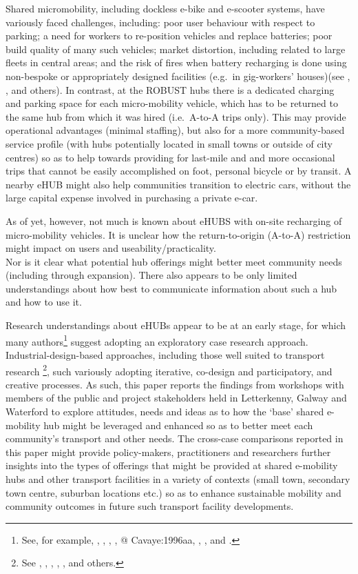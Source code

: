 \documentclass[preprint, 3p,
authoryear]{elsarticle} %
\begin{document}
Shared micromobility, including dockless e-bike and e-scooter systems,
have variously faced challenges, including: poor user behaviour with
respect to parking; a need for workers to re-position vehicles and
replace batteries; poor build quality of many such vehicles; market
distortion, including related to large fleets in central areas; and the
risk of fires when battery recharging is done using non-bespoke or
appropriately designed facilities (e.g.~in gig-workers' houses)(see
\citet{Zhang:2022aa}, \citet{Meigs:2023aa}, \citet{Ferguson:2025aa} and
others). In contrast, at the ROBUST hubs there is a dedicated charging
and parking space for each micro-mobility vehicle, which has to be
returned to the same hub from which it was hired (i.e.~A-to-A trips
only). This may provide operational advantages (minimal staffing), but
also for a more community-based service profile (with hubs potentially
located in small towns or outside of city centres) so as to help towards
providing for last-mile and and more occasional trips that cannot be
easily accomplished on foot, personal bicycle or by transit. A nearby
eHUB might also help communities transition to electric cars, without
the large capital expense involved in purchasing a private e-car.

As of yet, however, not much is known about eHUBS with on-site
recharging of micro-mobility vehicles. It is unclear how the
return-to-origin (A-to-A) restriction might impact on users and
useability/practicality.\\
Nor is it clear what potential hub offerings might better meet community
needs (including through expansion). There also appears to be only
limited understandings about how best to communicate information about
such a hub and how to use it.

Research understandings about eHUBs appear to be at an early stage, for
which many authors\footnote{See, for example, \citet{Bonoma:1984aa},
  \citet{Benbasat:1987aa}, \citet{Eisenhardt:1989aa},
  \citet{Meredith:1993aa}, @ Cavaye:1996aa, \citet{Darke:1998aa},
  \citet{Stuart:2002aa}, \citet{Voss:2002aa} and \citet{Yin:2018ab}.}
suggest adopting an exploratory case research approach.
Industrial-design-based approaches, including those well suited to
transport research \footnote{See \citet{Coxon:2018aa},
  \citet{Coxon:2021ab}, \citet{Gaitan:2021aa}, \citet{Napper:2021aa},
  \citet{Pink:2021aa}, \citet{UK-Design-Council:0aa} and others.}, such
variously adopting iterative, co-design and participatory, and creative
processes. As such, this paper reports the findings from workshops with
members of the public and project stakeholders held in Letterkenny,
Galway and Waterford to explore attitudes, needs and ideas as to how the
`base' shared e-mobility hub might be leveraged and enhanced so as to
better meet each community's transport and other needs. The cross-case
comparisons reported in this paper might provide policy-makers,
practitioners and researchers further insights into the types of
offerings that might be provided at shared e-mobility hubs and other
transport facilities in a variety of contexts (small town, secondary
town centre, suburban locations etc.) so as to enhance sustainable
mobility and community outcomes in future such transport facility
developments.
\end{document}
